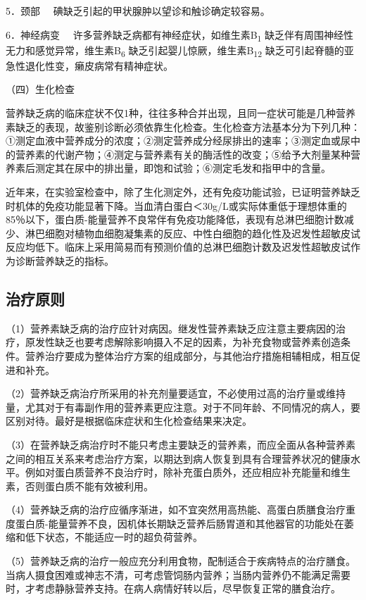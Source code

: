 {5．颈部} 　碘缺乏引起的甲状腺肿以望诊和触诊确定较容易。

{6．神经病变} 　许多营养缺乏病都有神经症状，如维生素B\textsubscript{1}
缺乏伴有周围神经性无力和感觉异常，维生素B\textsubscript{6}
缺乏引起婴儿惊厥，维生素B\textsubscript{12}
缺乏可引起脊髓的亚急性退化性变，癞皮病常有精神症状。

（四）生化检查

营养缺乏病的临床症状不仅1种，往往多种合并出现，且同一症状可能是几种营养素缺乏的表现，故鉴别诊断必须依靠生化检查。生化检查方法基本分为下列几种：①测定血液中营养成分的浓度；②测定营养成分经尿排出的速率；③测定血或尿中的营养素的代谢产物；④测定与营养素有关的酶活性的改变；⑤给予大剂量某种营养素后测定其在尿中的排出量，即饱和试验；⑥测定毛发和指甲中的含量。

近年来，在实验室检查中，除了生化测定外，还有免疫功能试验，已证明营养缺乏时机体的免疫功能显著下降。当血清白蛋白＜30g/L或实际体重低于理想体重的85％以下，蛋白质-能量营养不良常伴有免疫功能降低，表现有总淋巴细胞计数减少、淋巴细胞对植物血细胞凝集素的反应、中性白细胞的趋化性及迟发性超敏皮试反应均低下。临床上采用简易而有预测价值的总淋巴细胞计数及迟发性超敏皮试作为诊断营养缺乏的指标。

\hypertarget{text00003.htmlux5cux23mllj7}{%
\subsection{治疗原则}\label{text00003.htmlux5cux23mllj7}}

（1）营养素缺乏病的治疗应针对病因。继发性营养素缺乏应注意主要病因的治疗，原发性缺乏也要考虑解除影响摄入不足的因素，为补充食物或营养素创造条件。营养治疗要成为整体治疗方案的组成部分，与其他治疗措施相辅相成，相互促进和补充。

（2）营养缺乏病治疗所采用的补充剂量要适宜，不必使用过高的治疗量或维持量，尤其对于有毒副作用的营养素更应注意。对于不同年龄、不同情况的病人，要区别对待。最好是根据临床症状和生化检查结果来决定。

（3）在营养缺乏病治疗时不能只考虑主要缺乏的营养素，而应全面从各种营养素之间的相互关系来考虑治疗方案，以期达到病人恢复到具有合理营养状况的健康水平。例如对蛋白质营养不良治疗时，除补充蛋白质外，还应相应补充能量和维生素，否则蛋白质不能有效被利用。

（4）营养缺乏病的治疗应循序渐进，如不宜突然用高热能、高蛋白质膳食治疗重度蛋白质-能量营养不良，因机体长期缺乏营养后肠胃道和其他器官的功能处在萎缩和低下状态，不能适应一时的超负荷营养。

（5）营养缺乏病的治疗一般应充分利用食物，配制适合于疾病特点的治疗膳食。当病人摄食困难或神志不清，可考虑管饲肠内营养；当肠内营养仍不能满足需要时，才考虑静脉营养支持。在病人病情好转以后，尽早恢复正常的膳食治疗。


